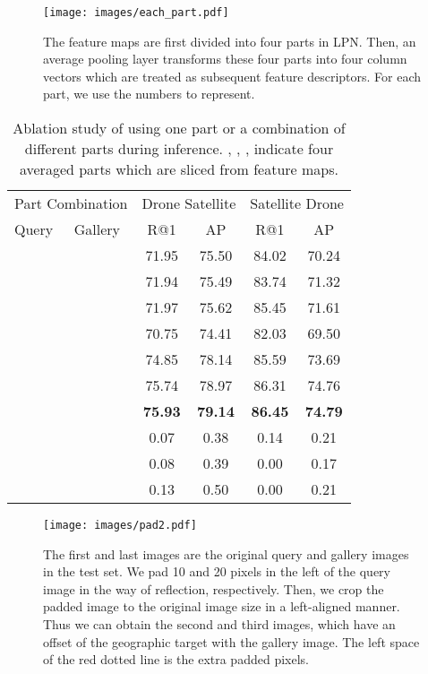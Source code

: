 \documentclass[journal]{IEEEtran}
\begin{document}
\begin{figure}[t]
  \centering
  \texttt{[image: images/each\_part.pdf]}
  \caption{The feature maps are first divided into four parts in LPN. Then, an average pooling layer transforms these four parts into four column vectors which are treated as subsequent feature descriptors. For each part, we use the numbers  to represent. }
  \label{fig:each_part}
\end{figure}

\setlength{\tabcolsep}{1pt}
\begin{table}[t]
\small
\caption{Ablation study of using one part or a combination of different parts during inference. , , ,  indicate four averaged parts which are sliced from feature maps.
}
\begin{center}
\begin{tabular}{ll|cc|cc}
\hline
\multicolumn{2}{c|}{Part Combination}& \multicolumn{2}{c|}{Drone  Satellite} & \multicolumn{2}{c}{Satellite  Drone}\\
 Query & Gallery & R@1 & AP & R@1 & AP\\
\shline
 &  & 71.95 & 75.50 & 84.02 & 70.24 \\
 &  & 71.94 & 75.49 & 83.74 & 71.32 \\
 &  & 71.97 & 75.62 & 85.45 & 71.61 \\
 &  & 70.75 & 74.41 & 82.03 & 69.50 \\
 &  & 74.85 & 78.14 & 85.59 & 73.69 \\
 &  & 75.74 & 78.97 & 86.31 & 74.76 \\
 &  & \textbf{75.93} & \textbf{79.14} & \textbf{86.45} & \textbf{74.79} \\
 &  & 0.07 & 0.38 & 0.14 & 0.21 \\
 &  & 0.08 & 0.39 & 0.00 & 0.17 \\
 &  & 0.13 & 0.50 & 0.00 & 0.21 \\
\hline
\end{tabular}
\end{center}
\label{table:part_influence}
\end{table}

\begin{figure}[t]
  \centering
  \texttt{[image: images/pad2.pdf]}
  \caption{The first and last images are the original query and gallery images in the test set. We pad 10 and 20 pixels in the left of the query image in the way of reflection, respectively. Then, we crop the padded image to the original image size in a left-aligned manner. Thus we can obtain the second and third images, which have an offset of the geographic target with the gallery image. The left space of the red dotted line is the extra padded pixels.}
  \label{fig:pad}
\end{figure}
\end{document}
